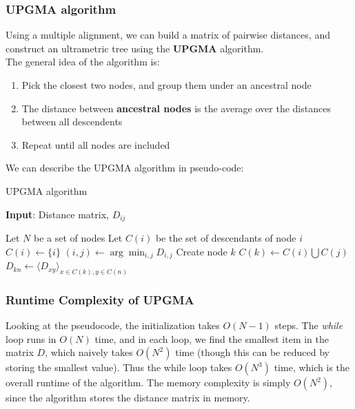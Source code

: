 \documentclass[12pt]{article}
\begin{document}
\subsubsection{UPGMA algorithm}
Using a multiple alignment, we can build a matrix of pairwise distances, and construct an ultrametric tree using the \textbf{UPGMA} algorithm.\\[10pt]
The general idea of the algorithm is:
\begin{enumerate}
    \item Pick the closest two nodes, and group them under an ancestral node
    \item The distance between \textbf{ancestral nodes} is the average over the distances between all descendents
    \item Repeat until all nodes are included
\end{enumerate}
We can describe the UPGMA algorithm in pseudo-code:
\begin{algorithm}
\caption{UPGMA algorithm}
\hspace*{\algorithmicindent} \textbf{Input}: Distance matrix, $D_{ij}$
\begin{algorithmic}
\State Let $N$ be a set of nodes
\State Let $C(i)$ be the set of descendants of node $i$
    \State$C(i) \leftarrow \{i\}$
\EndFor
{}
    \State $(i, j) \leftarrow \arg\min_{i,j}D_{i,j}$
    \State Create node $k$
    \State $C(k) \leftarrow C(i) \bigcup C(j)$
        \State $D_{kn} \leftarrow \langle D_{xy}\rangle_{x\in C(k), y\in C(n)}$
    \EndFor
\EndWhile
\end{algorithmic}
\end{algorithm}
\subsubsection{Runtime Complexity of UPGMA}
Looking at the pseudocode, the initialization takes $O(N-1)$ steps. The \textit{while} loop runs in $O(N)$ time, and in each loop, we find the smallest item in the matrix $D$, which naively takes $O(N^2)$ time (though this can be reduced by storing the smallest value). Thus the while loop takes $O(N^3)$ time, which is the overall runtime of the algorithm. The memory complexity is simply $O(N^2)$, since the algorithm stores the distance matrix in memory.
\end{document}
